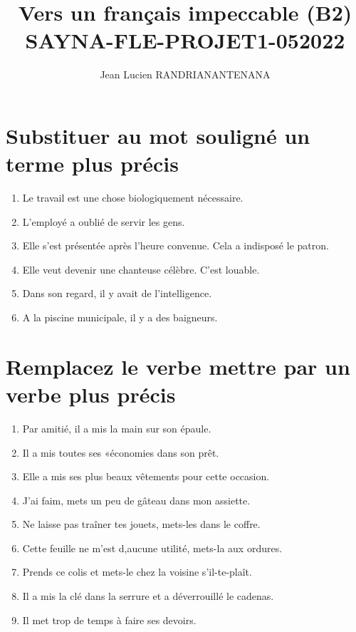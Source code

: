 \documentclass[12pt]{article}
\author{Jean Lucien RANDRIANANTENANA}
\title{Vers un français
impeccable (B2)\\SAYNA-FLE-PROJET1-052022}
\begin{document}
\maketitle
\tableofcontents
\newpage
\section{Substituer au mot souligné un terme plus précis}
\begin{enumerate}
	 \item Le travail est une chose biologiquement nécessaire. \item L’employé a oublié de servir les gens. \item Elle s’est présentée après l’heure convenue. Cela a indisposé le patron. \item Elle veut devenir une chanteuse célèbre. C’est louable. \item Dans son regard, il y avait de l’intelligence. \item A la piscine municipale, il y a des baigneurs.
\end{enumerate}

\section{Remplacez le verbe mettre par un verbe plus précis} 
\begin{enumerate}
	\item Par amitié, il a mis la main sur son épaule. \item Il a mis toutes ses «économies dans son prêt. \item Elle a mis ses plus beaux vêtements pour cette occasion. \item J’ai faim, mets un peu de gâteau dans mon assiette. \item Ne laisse pas traîner tes jouets, mets-les dans le coffre. \item Cette feuille ne m’est d,aucune utilité, mets-la aux ordures. \item Prends ce colis et mets-le chez la voisine s’il-te-plaît. \item Il a mis la clé dans la serrure et a déverrouillé le cadenas. \item Il met trop de temps à faire ses devoirs.
\end{enumerate}
\end{document}
